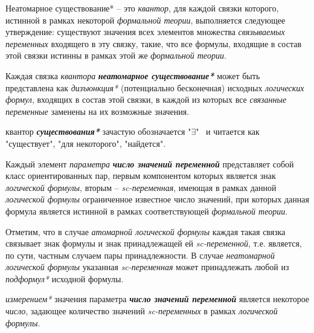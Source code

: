 Неатомарное существование* -- это \textit{квантор}, для каждой связки которого, истинной в рамках некоторой \textit{формальной теории}, выполняется следующее утверждение: существуют значения всех элементов множества \textit{связываемых переменных\scnrolesign} входящего в эту связку, такие, что все формулы, входящие в состав этой связки истинны в рамках этой же \textit{формальной теории}.

Каждая связка \textit{квантора} \textbf{\textit{неатомарное существование*}} может быть представлена как \textit{дизъюнкция*} (потенциально бесконечная) исходных \textit{логических формул}, входящих в состав этой связки, в каждой из которых все \textit{связанные переменные\scnrolesign} заменены на их возможные значения.

квантор \textbf{\textit{существования*}} зачастую обозначается "$\exists$" \ и читается как "существует"{}, "для некоторого"{}, "найдется".


\begin{SCn}
\end{SCn}

Каждый элемент \textit{параметра} \textbf{\textit{число значений переменной}} представляет собой класс ориентированных пар, первым компонентом которых является знак \textit{логической формулы}, вторым -- \textit{sc-переменная}, имеющая в рамках данной \textit{логической формулы} ограниченное известное число значений, при которых данная формула является истинной в рамках соответствующей \textit{формальной теории}.

Отметим, что в случае \textit{атомарной логической формулы} каждая такая связка связывает знак формулы и знак принадлежащей ей \textit{sc-переменной}, т.е. является, по сути, частным случаем пары принадлежности. В случае \textit{неатомарной логической формулы} указанная \textit{sc-переменная} может принадлежать любой из \textit{подформул*} исходной формулы.

\textit{измерением*} значения параметра \textbf{\textit{число значений переменной}} является некоторое \textit{число}, задающее количество значений \textit{sc-переменных} в рамках \textit{логической формулы}.

\begin{SCn}
\end{SCn}

